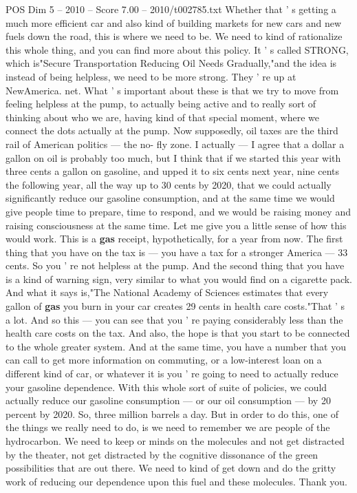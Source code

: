 \begin{textsample}{POS Dim 5 – 2010 – Score 7.00 – 2010/t002785.txt}
Whether that ' s getting a much more efficient car and also kind of building markets for new cars and new fuels down the road, this is where we need to be.
We need to kind of rationalize this whole thing, and you can find more about this policy.
It ' s called STRONG, which is"Secure Transportation Reducing Oil Needs Gradually,"and the idea is instead of being helpless, we need to be more strong.
They ' re up at NewAmerica. net.
What ' s important about these is that we try to move from feeling helpless at the pump, to actually being active and to really sort of thinking about who we are, having kind of that special moment, where we connect the dots actually at the pump.
Now supposedly, oil taxes are the third rail of American politics — the no- fly zone.
I actually — I agree that a dollar a gallon on oil is probably too much, but I think that if we started this year with three cents a gallon on gasoline, and upped it to six cents next year, nine cents the following year, all the way up to 30 cents by 2020, that we could actually significantly reduce our gasoline consumption, and at the same time we would give people time to prepare, time to respond, and we would be raising money and raising consciousness at the same time.
Let me give you a little sense of how this would work.
This is a \textbf{gas} receipt, hypothetically, for a year from now.
The first thing that you have on the tax is — you have a tax for a stronger America — 33 cents.
So you ' re not helpless at the pump.
And the second thing that you have is a kind of warning sign, very similar to what you would find on a cigarette pack.
And what it says is,"The National Academy of Sciences estimates that every gallon of \textbf{gas} you burn in your car creates 29 cents in health care costs."That ' s a lot.
And so this — you can see that you ' re paying considerably less than the health care costs on the tax.
And also, the hope is that you start to be connected to the whole greater system.
And at the same time, you have a number that you can call to get more information on commuting, or a low-interest loan on a different kind of car, or whatever it is you ' re going to need to actually reduce your gasoline dependence.
With this whole sort of suite of policies, we could actually reduce our gasoline consumption — or our oil consumption — by 20 percent by 2020.
So, three million barrels a day.
But in order to do this, one of the things we really need to do, is we need to remember we are people of the hydrocarbon.
We need to keep or minds on the molecules and not get distracted by the theater, not get distracted by the cognitive dissonance of the green possibilities that are out there.
We need to kind of get down and do the gritty work of reducing our dependence upon this fuel and these molecules.
Thank you.

\end{textsample}
